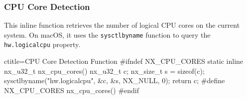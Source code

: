 \newpage
\subsubsection{CPU Core Detection}
\label{CPU Core Detection}
\begin{NexMainBox}
	\begin{NexMainBox}
		This inline function retrieves the number of logical CPU cores on the current system. On macOS, it uses the \texttt{sysctlbyname} function to query the \texttt{hw.logicalcpu} property.
	\end{NexMainBox}
\end{NexMainBox}

\begin{NexCodeBox}{c}{title={CPU Core Detection Function}}
#ifndef NX_CPU_CORES
static inline nx_u32_t nx_cpu_cores()
{
	nx_u32_t c;
	nx_size_t s = sizeof(c);
	sysctlbyname("hw.logicalcpu", &c, &s, NX_NULL, 0);
	return c;
}
#define NX_CPU_CORES nx_cpu_cores()
#endif
\end{NexCodeBox}


